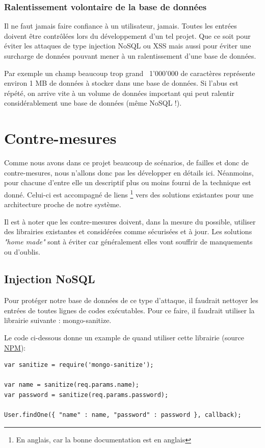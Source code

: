\documentclass[12pt]{article}
\begin{document}
\subsubsection{Ralentissement volontaire de la base de données}

Il ne faut jamais faire confiance à un utilisateur, jamais. Toutes les entrées doivent être contrôlées lors du développement d'un tel projet. Que ce soit pour éviter les attaques de type injection NoSQL ou XSS mais aussi pour éviter une surcharge de données pouvant mener à un ralentissement d'une base de données.

Par exemple un champ beaucoup trop grand ~1'000'000 de caractères représente environ 1 MB de données à stocker dans une base de données. Si l'abus est répété, on arrive vite à un volume de données important qui peut ralentir considérablement une base de données (même NoSQL !).
\clearpage

\section{Contre-mesures}
\label{sec:contremesures}

Comme nous avons dans ce projet beaucoup de scénarios, de failles et donc de contre-mesures, nous n'allons donc pas les développer en détails ici. Néanmoins, pour chacune d'entre elle un descriptif plus ou moins fourni de la technique est donné. Celui-ci est accompagné de liens \footnote{En anglais, car la bonne documentation est en anglais} vers des solutions existantes pour une architecture proche de notre système.

Il est à noter que les contre-mesures doivent, dans la mesure du possible, utiliser des librairies existantes et considérées comme sécurisées et à jour. Les solutions \emph{"home made"} sont à éviter car généralement elles vont souffrir de manquements ou d'oublis.

\subsection{Injection NoSQL}
\label{ssec:cm-injections}

Pour protéger notre base de données de ce type d'attaque, il faudrait nettoyer les entrées de toutes lignes de codes exécutables. Pour ce faire, il faudrait utiliser la librairie suivante : mongo-sanitize.

Le code ci-dessous donne un example de quand utiliser cette librairie (source \href{https://www.npmjs.com/package/mongo-sanitize}{NPM}):
\vspace{2mm}
\begin{lstlisting}[style=Java]
var sanitize = require('mongo-sanitize');

var name = sanitize(req.params.name);
var password = sanitize(req.params.password);

User.findOne({ "name" : name, "password" : password }, callback);
\end{lstlisting}
\end{document}

